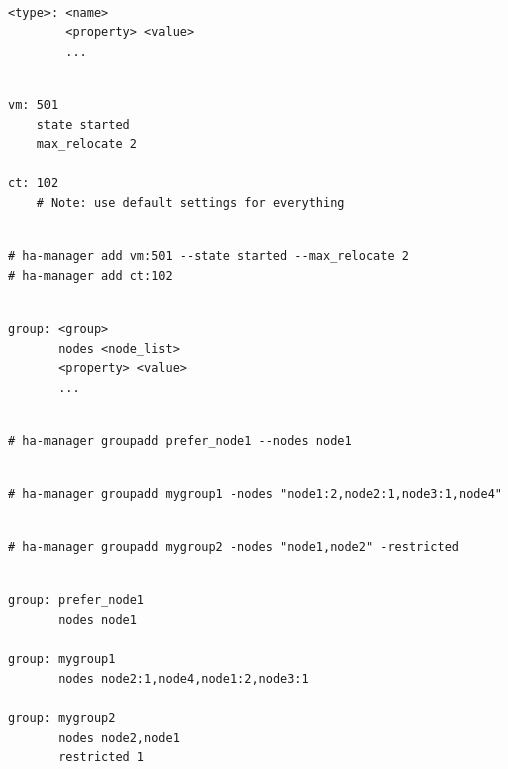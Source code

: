 \begin{lstlisting}

<type>: <name>
        <property> <value>
        ...

\end{lstlisting}

\begin{lstlisting}

vm: 501
    state started
    max_relocate 2

ct: 102
    # Note: use default settings for everything

\end{lstlisting}

\begin{lstlisting}

# ha-manager add vm:501 --state started --max_relocate 2
# ha-manager add ct:102

\end{lstlisting}

\begin{lstlisting}

group: <group>
       nodes <node_list>
       <property> <value>
       ...

\end{lstlisting}

\begin{lstlisting}

# ha-manager groupadd prefer_node1 --nodes node1

\end{lstlisting}

\begin{lstlisting}

# ha-manager groupadd mygroup1 -nodes "node1:2,node2:1,node3:1,node4"

\end{lstlisting}

\begin{lstlisting}

# ha-manager groupadd mygroup2 -nodes "node1,node2" -restricted

\end{lstlisting}

\begin{lstlisting}

group: prefer_node1
       nodes node1

group: mygroup1
       nodes node2:1,node4,node1:2,node3:1

group: mygroup2
       nodes node2,node1
       restricted 1

\end{lstlisting}

